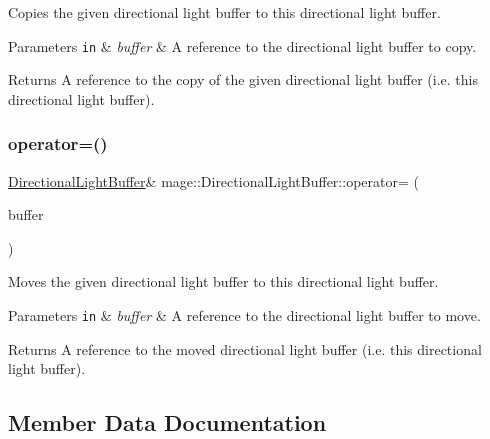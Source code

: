 Copies the given directional light buffer to this directional light buffer.


\begin{DoxyParams}[1]{Parameters}
\mbox{\tt in}  & {\em buffer} & A reference to the directional light buffer to copy. \\
\hline
\end{DoxyParams}
\begin{DoxyReturn}{Returns}
A reference to the copy of the given directional light buffer (i.\+e. this directional light buffer). 
\end{DoxyReturn}
\hypertarget{structmage_1_1_directional_light_buffer_a9af62b47c7ba1b1f6833e8da79b8c054}{}\label{structmage_1_1_directional_light_buffer_a9af62b47c7ba1b1f6833e8da79b8c054} 
\subsubsection{\texorpdfstring{operator=()}{operator=()}\hspace{0.1cm}{\footnotesize\ttfamily [2/2]}}
{\footnotesize\ttfamily \hyperlink{structmage_1_1_directional_light_buffer}{Directional\+Light\+Buffer}\& mage\+::\+Directional\+Light\+Buffer\+::operator= (\begin{DoxyParamCaption}\item[{\hyperlink{structmage_1_1_directional_light_buffer}{Directional\+Light\+Buffer} \&\&}]{buffer }\end{DoxyParamCaption})\hspace{0.3cm}{\ttfamily [default]}}

Moves the given directional light buffer to this directional light buffer.


\begin{DoxyParams}[1]{Parameters}
\mbox{\tt in}  & {\em buffer} & A reference to the directional light buffer to move. \\
\hline
\end{DoxyParams}
\begin{DoxyReturn}{Returns}
A reference to the moved directional light buffer (i.\+e. this directional light buffer). 
\end{DoxyReturn}


\subsection{Member Data Documentation}
\hypertarget{structmage_1_1_directional_light_buffer_a357b86deb8ed2926cb77ed8191e967e6}{}\label{structmage_1_1_directional_light_buffer_a357b86deb8ed2926cb77ed8191e967e6} 
